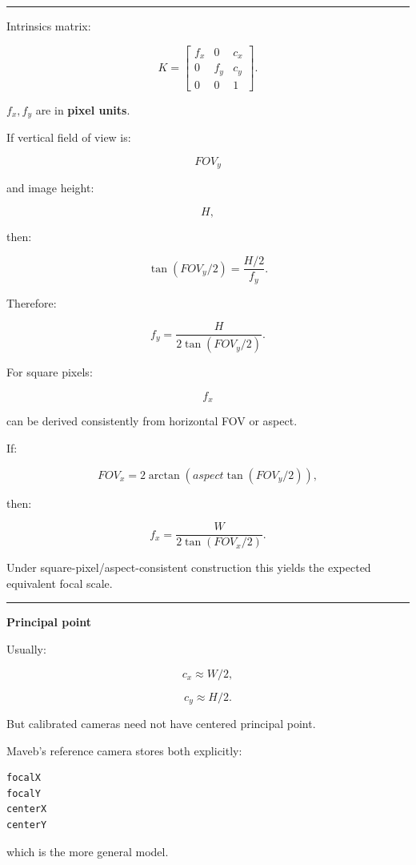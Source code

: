 \begin{center}\rule{0.5\linewidth}{0.5pt}\end{center}

Intrinsics matrix:

\[
\boxed{
K=
\begin{bmatrix}
f_x&0&c_x\\
0&f_y&c_y\\
0&0&1
\end{bmatrix}.
}
\]

\(f_x,f_y\) are in \textbf{pixel units}.

If vertical field of view is:

\[
FOV_y
\]

and image height:

\[
H,
\]

then:

\[
\tan(FOV_y/2)
=
\frac{H/2}{f_y}.
\]

Therefore:

\[
\boxed{
f_y=
\frac{H}
{2\tan(FOV_y/2)}.
}
\]

For square pixels:

\[
f_x
\]

can be derived consistently from horizontal FOV or aspect.

If:

\[
FOV_x
=
2\arctan(
aspect\tan(FOV_y/2)
),
\]

then:

\[
f_x=
\frac{W}
{2\tan(FOV_x/2)}.
\]

Under square-pixel/aspect-consistent construction this yields the expected equivalent focal scale.

\begin{center}\rule{0.5\linewidth}{0.5pt}\end{center}

\textbf{Principal point}

Usually:

\[
c_x\approx W/2,
\]

\[
c_y\approx H/2.
\]

But calibrated cameras need not have centered principal point.

Maveb's reference camera stores both explicitly:

\protect{}\label{30s5gu}%
\begin{verbatim}
focalX
focalY
centerX
centerY
\end{verbatim}

which is the more general model.

